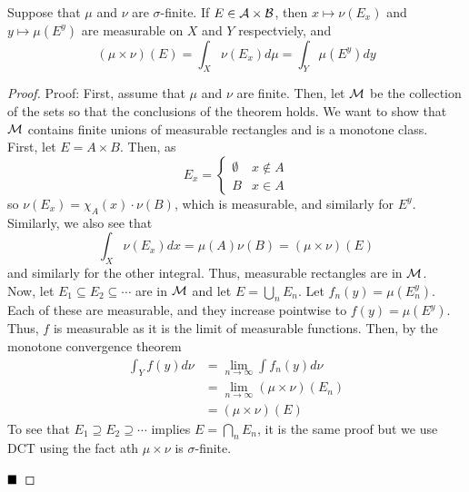 \begin{lemma}
    Suppose that $\mu$ and $\nu$ are $\sigma$-finite. If $E \in \cal{A} \times \cal{B}$, then $x \mapsto \nu(E_{x})$ and $y \mapsto \mu(E^{y})$ are measurable on $X$ and $Y$ respectviely, and
    \[ (\mu \times \nu)(E) = \int_{X} \nu(E_{x})d\mu = \int_{Y} \mu(E^{y})dy \]
\end{lemma}
\begin{proof}{Proof:}
    First, assume that $\mu$ and $\nu$ are finite. Then, let $\cal{M}$ be the collection of the sets so that the conclusions of the theorem holds. We want to show that $\cal{M}$ contains finite unions of measurable rectangles and is a monotone class.\\

    First, let $E = A \times B$. Then, as
    \[ E_{x} = \left\{\begin{matrix} \emptyset & x \notin A \\ B & x \in A \end{matrix}\right. \]
    so $\nu(E_{x}) = \chi_{A}(x) \cdot \nu(B)$, which is measurable, and similarly for $E^{y}$. Similarly, we also see that
    \[ \int_{X} \nu(E_{x})dx = \mu(A)\nu(B) = (\mu \times \nu)(E) \]
    and similarly for the other integral. Thus, measurable rectangles are in $\cal{M}$.\\

    Now, let $E_1 \subseteq E_2 \subseteq \cdots$ are in $\cal{M}$ and let $E = \bigcup_{n} E_n$. Let $f_{n}(y) = \mu(E_{n}^{y})$. Each of these are measurable, and they increase pointwise to $f(y) = \mu(E^{y})$. Thus, $f$ is measurable as it is the limit of measurable functions. Then, by the monotone convergence theorem
    \begin{align*}
        \int_{Y} f(y) d\nu &= \lim_{n \to \infty} \int f_{n}(y)d\nu\\
        &= \lim_{n \to \infty} (\mu \times \nu)(E_n)\\
        &= (\mu \times \nu)(E)
    \end{align*}
    To see that $E_1 \supseteq E_2 \supseteq \cdots$ implies $E = \bigcap_{n} E_n$, it is the same proof but we use DCT using the fact ath $\mu \times \nu$ is $\sigma$-finite. 

    $\qed$
\end{proof}